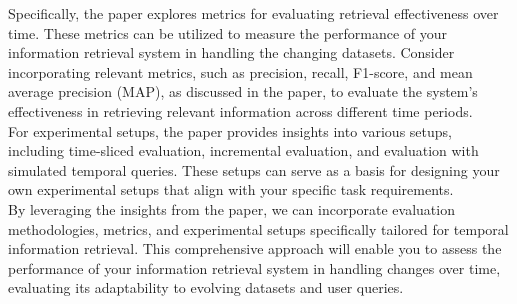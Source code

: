 Specifically, the paper explores metrics for evaluating retrieval effectiveness over time. These metrics 
can be utilized to measure the performance of your information retrieval system in handling the changing 
datasets. Consider incorporating relevant metrics, such as precision, recall, F1-score, and mean average 
precision (MAP), as discussed in the paper, to evaluate the system's effectiveness in retrieving relevant 
information across different time periods.\\

For experimental setups, the paper provides insights into various setups, including time-sliced evaluation, 
incremental evaluation, and evaluation with simulated temporal queries. These setups can serve as a basis 
for designing your own experimental setups that align with your specific task requirements.\\

By leveraging the insights from the paper, we can incorporate evaluation methodologies, metrics, and
experimental setups specifically tailored for temporal information retrieval. 
This comprehensive approach will enable you to assess the performance of your information retrieval 
system in handling changes over time, evaluating its adaptability to evolving datasets and user queries.\\
